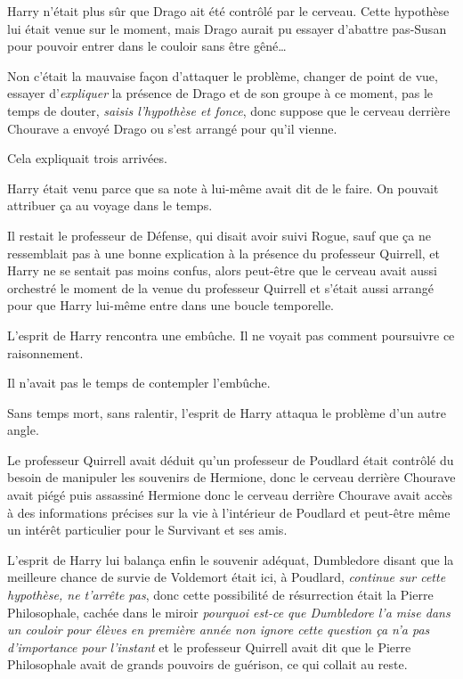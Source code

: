 Harry n'était plus sûr que Drago ait été contrôlé par le cerveau.
Cette hypothèse lui était venue sur le moment, mais Drago aurait pu essayer d'abattre pas-Susan pour pouvoir entrer dans le couloir sans être gêné…

Non c'était la mauvaise façon d'attaquer le problème, changer de point de vue, essayer d'\emph{expliquer} la présence de Drago et de son groupe à ce moment, pas le temps de douter, \emph{saisis l'hypothèse et fonce}, donc suppose que le cerveau derrière Chourave a envoyé Drago ou s'est arrangé pour qu'il vienne.

Cela expliquait trois arrivées.

Harry était venu parce que sa note à lui-même avait dit de le faire.
On pouvait attribuer ça au voyage dans le temps.

Il restait le professeur de Défense, qui disait avoir suivi Rogue, sauf que ça ne ressemblait pas à une bonne explication à la présence du professeur Quirrell, et Harry ne se sentait pas moins confus, alors peut-être que le cerveau avait aussi orchestré le moment de la venue du professeur Quirrell et s'était aussi arrangé pour que Harry lui-même entre dans une boucle temporelle.

L'esprit de Harry rencontra une embûche.
Il ne voyait pas comment poursuivre ce raisonnement.

Il n'avait pas le temps de contempler l'embûche.

Sans temps mort, sans ralentir, l'esprit de Harry attaqua le problème d'un autre angle.

Le professeur Quirrell avait déduit qu'un professeur de Poudlard était contrôlé du besoin de manipuler les souvenirs de Hermione, donc le cerveau derrière Chourave avait piégé puis assassiné Hermione donc le cerveau derrière Chourave avait accès à des informations précises sur la vie à l'intérieur de Poudlard et peut-être même un intérêt particulier pour le Survivant et ses amis.

L'esprit de Harry lui balança enfin le souvenir adéquat, Dumbledore disant que la meilleure chance de survie de Voldemort était ici, à Poudlard, \emph{continue sur cette hypothèse, ne t'arrête pas}, donc cette possibilité de résurrection était la Pierre Philosophale, cachée dans le miroir \emph{pourquoi est-ce que Dumbledore l'a mise dans un couloir pour élèves en première année non ignore cette question ça n'a pas d'importance pour l'instant} et le professeur Quirrell avait dit que le Pierre Philosophale avait de grands pouvoirs de guérison, ce qui collait au reste.

